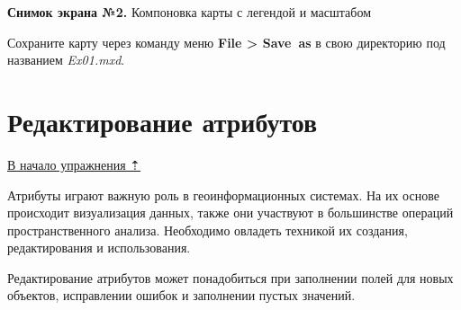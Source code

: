 \documentclass[]{book}
\theoremstyle{definition}
\theoremstyle{definition}
\theoremstyle{definition}
\theoremstyle{remark}
\begin{document}
\textbf{Снимок экрана №2.} Компоновка карты с легендой и масштабом

Сохраните карту через команду меню \textbf{File \textgreater{} Save~as}
в свою директорию под названием \emph{Ex01.mxd}.

\hypertarget{map-design-quaternary-attributes}{%
\section{Редактирование
атрибутов}\label{map-design-quaternary-attributes}}

\protect\hyperlink{map-design-quaternary}{В начало упражнения ⇡}

Атрибуты играют важную роль в геоинформационных системах. На их основе
происходит визуализация данных, также они участвуют в большинстве
операций пространственного анализа. Необходимо овладеть техникой их
создания, редактирования и использования.

Редактирование атрибутов может понадобиться при заполнении полей для
новых объектов, исправлении ошибок и заполнении пустых значений.
\end{document}
